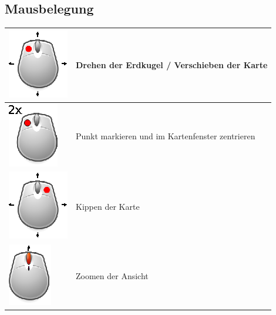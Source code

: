 \documentclass[10pt]{scrreprt}
\begin{document}
\subsection*{Mausbelegung}
\begin{tabular}{|>{\centering \arraybackslash}m{3cm}|m{9cm}|}
\hline
\includegraphics[scale=1.0]{KeyImages/mouseDrag_left.eps} & Drehen der Erdkugel / Verschieben der Karte \\ 
\hline 
\includegraphics[scale=1.0]{KeyImages/mouseDoubleClick_left.eps} & Punkt markieren und im Kartenfenster zentrieren \\
\hline
\includegraphics[scale=1.0]{KeyImages/mouseDrag_right.eps} & Kippen der Karte \\
\hline
\includegraphics[scale=1.0]{KeyImages/mouse_scrollen.eps} & Zoomen der Ansicht \\
\hline
\end{tabular} 



\vspace{5mm}
\end{document}
